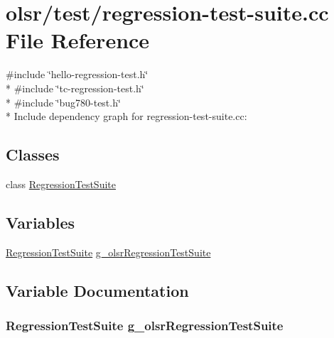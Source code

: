 \hypertarget{regression-test-suite_8cc}{}\section{olsr/test/regression-\/test-\/suite.cc File Reference}
\label{regression-test-suite_8cc}
{\ttfamily \#include \char`\"{}hello-\/regression-\/test.\+h\char`\"{}}\\*
{\ttfamily \#include \char`\"{}tc-\/regression-\/test.\+h\char`\"{}}\\*
{\ttfamily \#include \char`\"{}bug780-\/test.\+h\char`\"{}}\\*
Include dependency graph for regression-\/test-\/suite.cc\+:
\subsection*{Classes}
\begin{DoxyCompactItemize}
\item 
class \hyperlink{classRegressionTestSuite}{Regression\+Test\+Suite}
\end{DoxyCompactItemize}
\subsection*{Variables}
\begin{DoxyCompactItemize}
\item 
\hyperlink{classRegressionTestSuite}{Regression\+Test\+Suite} \hyperlink{regression-test-suite_8cc_a30a315685afd2b8881b90e1a805185c8}{g\+\_\+olsr\+Regression\+Test\+Suite}
\end{DoxyCompactItemize}


\subsection{Variable Documentation}
\subsubsection[{\texorpdfstring{g\+\_\+olsr\+Regression\+Test\+Suite}{g_olsrRegressionTestSuite}}]{\setlength{\rightskip}{0pt plus 5cm} {\bf Regression\+Test\+Suite}  g\+\_\+olsr\+Regression\+Test\+Suite}\hypertarget{regression-test-suite_8cc_a30a315685afd2b8881b90e1a805185c8}{}\label{regression-test-suite_8cc_a30a315685afd2b8881b90e1a805185c8}
